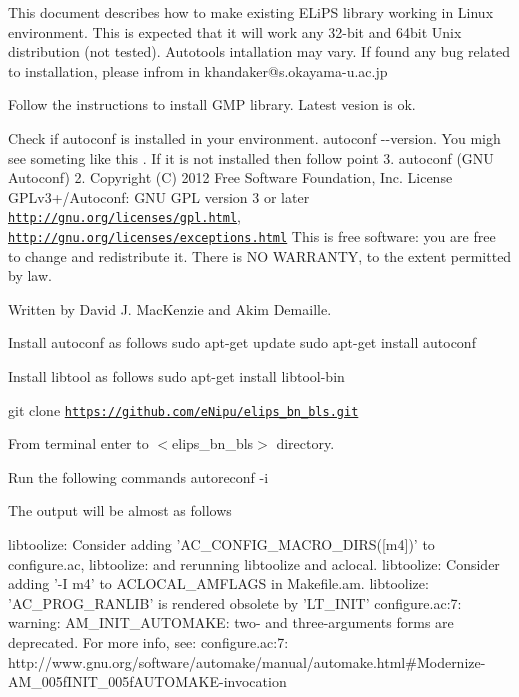 This document describes how to make existing E\+Li\+PS library working in Linux environment. This is expected that it will work any 32-\/bit and 64bit Unix distribution (not tested). Autotools intallation may vary. If found any bug related to installation, please infrom in {\ttfamily khandaker@s.\+okayama-\/u.\+ac.\+jp}


\begin{DoxyEnumerate}
\item Follow the instructions to install {\ttfamily G\+MP} library. Latest vesion is ok.
\item Check if {\ttfamily autoconf} is installed in your environment. {\ttfamily autoconf -\/-\/version}. You migh see someting like this . If it is not installed then follow point 3. autoconf (G\+NU Autoconf) 2. Copyright (C) 2012 Free Software Foundation, Inc. License G\+P\+Lv3+/\+Autoconf\+: G\+NU G\+PL version 3 or later \href{http://gnu.org/licenses/gpl.html}{\tt http\+://gnu.\+org/licenses/gpl.\+html}, \href{http://gnu.org/licenses/exceptions.html}{\tt http\+://gnu.\+org/licenses/exceptions.\+html} This is free software\+: you are free to change and redistribute it. There is NO W\+A\+R\+R\+A\+N\+TY, to the extent permitted by law.

Written by David J. Mac\+Kenzie and Akim Demaille.
\item Install {\ttfamily autoconf} as follows sudo apt-\/get update sudo apt-\/get install autoconf
\item Install {\ttfamily libtool} as follows sudo apt-\/get install libtool-\/bin
\item git clone {\ttfamily \href{https://github.com/eNipu/elips_bn_bls.git}{\tt https\+://github.\+com/e\+Nipu/elips\+\_\+bn\+\_\+bls.\+git}}
\item From terminal enter to {\ttfamily $<$elips\+\_\+bn\+\_\+bls$>$} directory.
\item Run the following commands {\ttfamily autoreconf -\/i}
\end{DoxyEnumerate}

The output will be almost as follows \begin{DoxyVerb}libtoolize: Consider adding 'AC_CONFIG_MACRO_DIRS([m4])' to configure.ac,
libtoolize: and rerunning libtoolize and aclocal.
libtoolize: Consider adding '-I m4' to ACLOCAL_AMFLAGS in Makefile.am.
libtoolize: 'AC_PROG_RANLIB' is rendered obsolete by 'LT_INIT'
configure.ac:7: warning: AM_INIT_AUTOMAKE: two- and three-arguments forms are deprecated.  For more info, see:
configure.ac:7: http://www.gnu.org/software/automake/manual/automake.html#Modernize-AM_005fINIT_005fAUTOMAKE-invocation 
\end{DoxyVerb}

